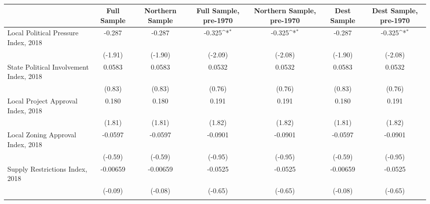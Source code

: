\begin{table}[htbp]\centering
\def\sym#1{\ifmmode^{#1}\else\(^{#1}\)\fi}
\caption{ \label{tab1}}
\begin{tabular}{l*{6}{c}}
\toprule
                    &\multicolumn{1}{c}{Full Sample}&\multicolumn{1}{c}{Northern Sample}&\multicolumn{1}{c}{Full Sample, pre-1970}&\multicolumn{1}{c}{Northern Sample, pre-1970}&\multicolumn{1}{c}{Dest Sample}&\multicolumn{1}{c}{Dest Sample, pre-1970}\\
\midrule
Local Political Pressure Index, 2018&      -0.287         &      -0.287         &      -0.325\sym{*}  &      -0.325\sym{*}  &      -0.287         &      -0.325\sym{*}  \\
                    &     (-1.91)         &     (-1.90)         &     (-2.09)         &     (-2.08)         &     (-1.90)         &     (-2.08)         \\
\addlinespace
State Political Involvement Index, 2018&      0.0583         &      0.0583         &      0.0532         &      0.0532         &      0.0583         &      0.0532         \\
                    &      (0.83)         &      (0.83)         &      (0.76)         &      (0.76)         &      (0.83)         &      (0.76)         \\
\addlinespace
Local Project Approval Index, 2018&       0.180         &       0.180         &       0.191         &       0.191         &       0.180         &       0.191         \\
                    &      (1.81)         &      (1.81)         &      (1.82)         &      (1.82)         &      (1.81)         &      (1.82)         \\
\addlinespace
Local Zoning Approval Index, 2018&     -0.0597         &     -0.0597         &     -0.0901         &     -0.0901         &     -0.0597         &     -0.0901         \\
                    &     (-0.59)         &     (-0.59)         &     (-0.95)         &     (-0.95)         &     (-0.59)         &     (-0.95)         \\
\addlinespace
Supply Restrictions Index, 2018&    -0.00659         &    -0.00659         &     -0.0525         &     -0.0525         &    -0.00659         &     -0.0525         \\
                    &     (-0.09)         &     (-0.08)         &     (-0.65)         &     (-0.65)         &     (-0.08)         &     (-0.65)         \\
\addlinespace

\end{tabular}
\end{table}
